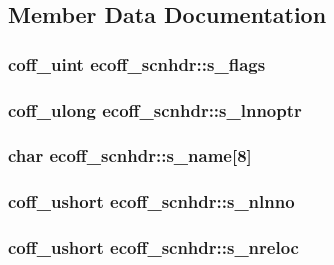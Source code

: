 \subsection{Member Data Documentation}
\hypertarget{structecoff__scnhdr_ad13d56f39169e77dc3316a45880a9807}{
\subsubsection[{s\_\-flags}]{\setlength{\rightskip}{0pt plus 5cm}coff\_\-uint {\bf ecoff\_\-scnhdr::s\_\-flags}}}
\label{structecoff__scnhdr_ad13d56f39169e77dc3316a45880a9807}
\hypertarget{structecoff__scnhdr_af5727b471bff83f01f93c99510e677e0}{
\subsubsection[{s\_\-lnnoptr}]{\setlength{\rightskip}{0pt plus 5cm}coff\_\-ulong {\bf ecoff\_\-scnhdr::s\_\-lnnoptr}}}
\label{structecoff__scnhdr_af5727b471bff83f01f93c99510e677e0}
\hypertarget{structecoff__scnhdr_a1f2d2b81e9f0cd194152febd54f5a60d}{
\subsubsection[{s\_\-name}]{\setlength{\rightskip}{0pt plus 5cm}char {\bf ecoff\_\-scnhdr::s\_\-name}\mbox{[}8\mbox{]}}}
\label{structecoff__scnhdr_a1f2d2b81e9f0cd194152febd54f5a60d}
\hypertarget{structecoff__scnhdr_ab1e4817f1922e0f96392968eb5e5a8f8}{
\subsubsection[{s\_\-nlnno}]{\setlength{\rightskip}{0pt plus 5cm}coff\_\-ushort {\bf ecoff\_\-scnhdr::s\_\-nlnno}}}
\label{structecoff__scnhdr_ab1e4817f1922e0f96392968eb5e5a8f8}
\hypertarget{structecoff__scnhdr_a844726d2153a3eb0075680c12a9828b7}{
\subsubsection[{s\_\-nreloc}]{\setlength{\rightskip}{0pt plus 5cm}coff\_\-ushort {\bf ecoff\_\-scnhdr::s\_\-nreloc}}}
